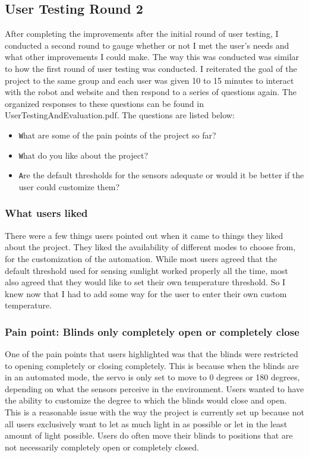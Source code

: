 \documentclass[10pt,twocolumn]{article}
\begin{document}
\subsection{User Testing Round 2}
After completing the improvements after the initial round of user testing, I conducted a second round to gauge whether or not I met the user’s needs and what other improvements I could make. The way this was conducted was similar to how the first round of user testing was conducted. I reiterated the goal of the project to the same group and each user was given 10 to 15 minutes to interact with the robot and website and then respond to a series of questions again. The organized responses to these questions can be found in UserTestingAndEvaluation.pdf. The questions are listed below:

\begin{itemize}
    \item \texttt What are some of the pain points of the project so far?
    \item \texttt What do you like about the project?
    \item \texttt Are the default thresholds for the sensors adequate or would it be better if the user could customize them?
\end{itemize}

\subsubsection{What users liked}
There were a few things users pointed out when it came to things they liked about the project. They liked the availability of different modes to choose from, for the customization of the automation. While most users agreed that the default threshold used for sensing sunlight worked properly all the time, most also agreed that they would like to set their own temperature threshold. So I knew now that I had to add some way for the user to enter their own custom temperature.

\subsubsection{Pain point: Blinds only completely open or completely close}
One of the pain points that users highlighted was that the blinds were restricted to opening completely or closing completely. This is because when the blinds are in an automated mode, the servo is only set to move to 0 degrees or 180 degrees, depending on what the sensors perceive in the environment. Users wanted to have the ability to customize the degree to which the blinds would close and open. This is a reasonable issue with the way the project is currently set up because not all users exclusively want to let as much light in as possible or let in the least amount of light possible. Users do often move their blinds to positions that are not necessarily completely open or completely closed.
\end{document}

